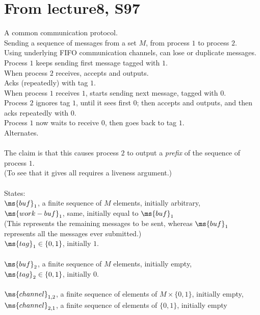 \section{From lecture8, S97}

A common communication protocol. \\
Sending a sequence of messages from a set $M$, from process $1$ to
process $2$. \\
Using underlying FIFO communication channels, can lose or duplicate
messages. \\
Process $1$ keeps sending first message tagged with $1$. \\
When process $2$ receives, accepts and outputs. \\
Acks (repeatedly) with tag $1$. \\
When process $1$ receives $1$, starts sending next message, tagged
with $0$. \\
Process $2$ ignores tag $1$, until it sees first $0$; then accepts and
outputs, and then acks repeatedly with $0$. \\
Process $1$ now waits to receive $0$, then goes back to tag $1$. \\
Alternates. \\
\\
The claim is that this causes process $2$ to output a {\em prefix\/}
of the sequence of process $1$. \\
(To see that it gives all requires a liveness argument.) \\
\\
States: \\
$\ms{buf}_1$, a finite sequence of $M$ elements, initially arbitrary,\\
$\ms{work-buf}_1$, same, initially equal to $\ms{buf}_1$ \\
(This represents the remaining messages to be sent, whereas
$\ms{buf}_1$ represents all the messages ever submitted.) \\
$\ms{tag}_1 \in \{ 0, 1 \}$, initially $1$. \\
\\
$\ms{buf}_2$, a finite sequence of $M$ elements, initially empty,\\
$\ms{tag}_2  \in \{ 0, 1 \}$, initially $0$. \\
\\
$\ms{channel}_{1,2}$, a finite sequence of elements of $M \times \{ 0, 1 \}$, 
  initially empty, \\
$\ms{channel}_{2,1}$, a finite sequence of elements of 
  $\{ 0, 1 \}$, initially empty \\
\\


